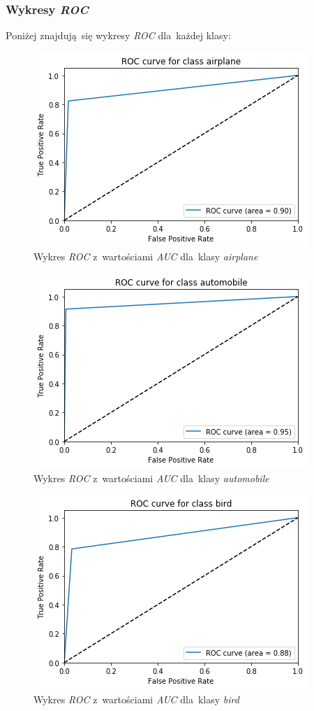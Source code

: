 \documentclass[11pt, a4paper]{article}
\begin{document}
\subsubsection{Wykresy \textit{ROC}}
Poniżej znajdują~się wykresy \textit{ROC} dla~każdej klasy:
\begin{figure}[H]
\centering
    \includegraphics[scale=0.8]{roc_0.png}
    \caption{Wykres \textit{ROC} z~wartościami \textit{AUC} dla~klasy \textit{airplane}}
\end{figure}
\begin{figure}[H]
\centering
    \includegraphics[scale=0.8]{roc_1.png}
    \caption{Wykres \textit{ROC} z~wartościami \textit{AUC} dla~klasy \textit{automobile}}
\end{figure}
\begin{figure}[H]
\centering
    \includegraphics[scale=0.8]{roc_2.png}
    \caption{Wykres \textit{ROC} z~wartościami \textit{AUC} dla~klasy \textit{bird}}
\end{figure}
\end{document}
